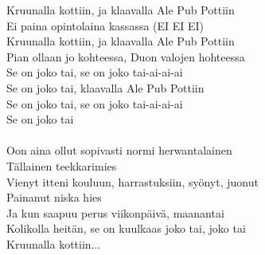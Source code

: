 
Kruunalla kottiin, ja klaavalla Ale Pub Pottiin \\
Ei paina opintolaina kassassa (EI EI EI) \\
Kruunalla kottiin, ja klaavalla Ale Pub Pottiin \\
Pian ollaan jo kohteessa, Duon valojen hohteessa \\
Se on joko tai, se on joko tai-ai-ai-ai \\
Se on joko tai, klaavalla Ale Pub Pottiin \\
Se on joko tai, se on joko tai-ai-ai-ai \\
Se on joko tai \\
\hspace{10mm} \\
Oon aina ollut sopivasti normi herwantalainen \\
Tällainen teekkarimies \\
Vienyt itteni kouluun, harrastuksiin, syönyt, juonut \\
Painanut niska hies \\
Ja kun saapuu perus viikonpäivä, maanantai \\
Kolikolla heitän, se on kuulkaas joko tai, joko tai \\
\hspace{10mm}
Kruunalla kottiin... \\
